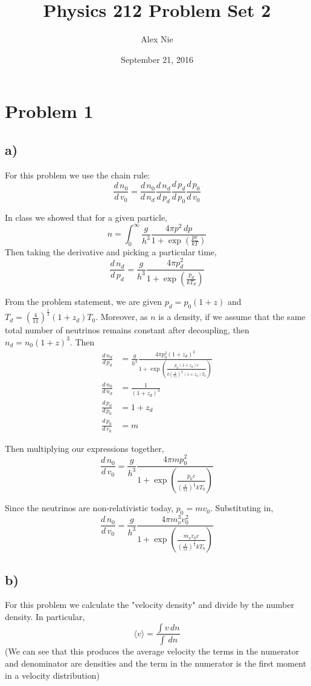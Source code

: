 \documentclass{article}
\title{Physics 212 Problem Set 2}
\author{Alex Nie}
\date{September 21, 2016}
\newcommand{\tot}[2]{\frac{d\,#1}{d\,#2}}
\begin{document}
\maketitle

\section*{Problem 1}
\subsection*{a)}
For this problem we use the chain rule:
\[\tot{n_0}{v_0} = \tot{n_0}{n_d}\tot{n_d}{p_d}\tot{p_d}{p_0}\tot{p_0}{v_0}\]

In class we showed that for a given particle,
\[n = \int_{0}^{\infty} \frac{g}{h^3}\frac{4\pi p^2\,dp}{1+\exp(\frac{pc}{kT})} \]
Then taking the derivative and picking a particular time,
\[\tot{n_d}{p_d} = \frac{g}{h^3}\frac{4\pi p_d^2}{1+\exp(\frac{p_d}{kT_d})}\]

From the problem statement, we are given $p_d = p_0(1+z)$ and $T_d = \left(\frac{4}{11}\right)^{\frac{1}{3}}(1+z_d)T_0$. Moreover, as $n$ is a density, if we assume that the same total number of neutrinos remains constant after decoupling, then $n_d = n_0(1+z)^3$. Then
\begin{align*}
\tot{n_d}{p_d} &= \frac{g}{h^3}\frac{4\pi p_0^2 (1+z_d)^2}{1+\exp\left(\frac{p_0(1+z_d)c}{k\left(\frac{4}{11}\right)^{\frac{1}{3}}(1+z_d)T_0}\right)}\\
\tot{n_0}{n_d} &= \frac{1}{(1+z_d)^3}\\
\tot{p_d}{p_0} &= 1+z_d\\
\tot{p_0}{v_0} &= m
\end{align*}

Then multiplying our expressions together,
\[\tot{n_0}{v_0} = \frac{g}{h^3}\frac{4\pi m p_0^2}{1+\exp\left(\frac{p_0 c}{\left(\frac{4}{11}\right)^{\frac{1}{3}}k T_0}\right)}\]

Since the neutrinos are non-relativistic today, $p_0 = m v_0$. Substituting in,
\[\tot{n_0}{v_0} = \frac{g}{h^3}\frac{4\pi m_\nu^3v_0^2}{1+\exp\left(\frac{m_\nu v_0 c}{\left(\frac{4}{11}\right)^{\frac{1}{3}}kT_0}\right)}\]

\subsection*{b)}
For this problem we calculate the "velocity density" and divide by the number density. In particular,
\[\langle v\rangle = \frac{\int v\,dn}{\int\,dn}\]
(We can see that this produces the average velocity the terms in the numerator and denominator are densities and the term in the numerator is the first moment in a velocity distribution)
\end{document}
